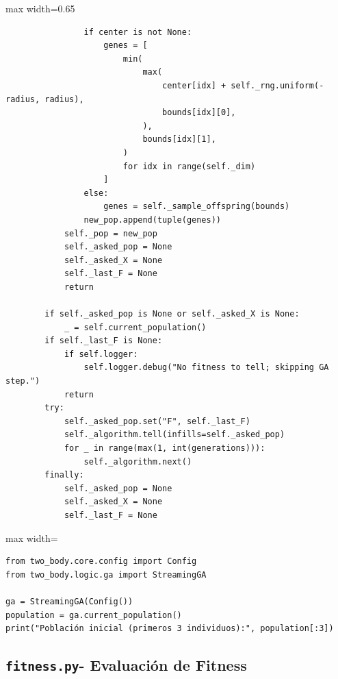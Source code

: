 \begin{listing}[H]
\begin{adjustbox}{max width=0.65\textwidth}
\begin{minipage}{\textwidth}
\begin{verbatim}
                if center is not None:
                    genes = [
                        min(
                            max(
                                center[idx] + self._rng.uniform(-radius, radius),
                                bounds[idx][0],
                            ),
                            bounds[idx][1],
                        )
                        for idx in range(self._dim)
                    ]
                else:
                    genes = self._sample_offspring(bounds)
                new_pop.append(tuple(genes))
            self._pop = new_pop
            self._asked_pop = None
            self._asked_X = None
            self._last_F = None
            return

        if self._asked_pop is None or self._asked_X is None:
            _ = self.current_population()
        if self._last_F is None:
            if self.logger:
                self.logger.debug("No fitness to tell; skipping GA step.")
            return
        try:
            self._asked_pop.set("F", self._last_F)
            self._algorithm.tell(infills=self._asked_pop)
            for _ in range(max(1, int(generations))):
                self._algorithm.next()
        finally:
            self._asked_pop = None
            self._asked_X = None
            self._last_F = None
\end{verbatim}
\end{minipage}
\end{adjustbox}
\end{listing}

\begin{listing}[H]
\caption{Ejemplo de inicialización de \texttt{StreamingGA}}
\begin{adjustbox}{max width=\textwidth}
\begin{minipage}{\textwidth}
\begin{verbatim}
from two_body.core.config import Config
from two_body.logic.ga import StreamingGA

ga = StreamingGA(Config())
population = ga.current_population()
print("Población inicial (primeros 3 individuos):", population[:3])
\end{verbatim}
\end{minipage}
\end{adjustbox}
\end{listing}

\subsection{\texttt{fitness.py}\-- Evaluación de Fitness}
